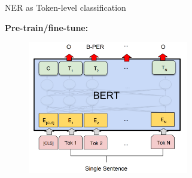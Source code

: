 \begin{vbframe}{NER as Token-level classification}

\vfill

\textbf{Pre-train/fine-tune:}

	\begin{figure}
		\centering
		\includegraphics[width = 7cm]{figure/toklevel.png}\\ 
	\end{figure}

\vfill

\end{vbframe}


